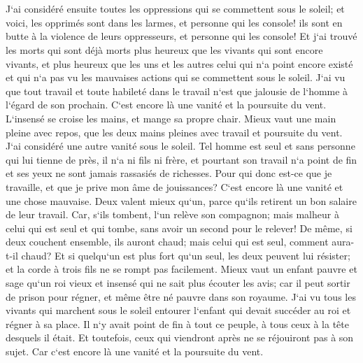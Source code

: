 \chapter{}

\verse J`ai considéré ensuite toutes les oppressions qui se commettent sous le soleil; et voici, les opprimés sont dans les larmes, et personne qui les console! ils sont en butte à la violence de leurs oppresseurs, et personne qui les console! 
\verse Et j`ai trouvé les morts qui sont déjà morts plus heureux que les vivants qui sont encore vivants, 
\verse et plus heureux que les uns et les autres celui qui n`a point encore existé et qui n`a pas vu les mauvaises actions qui se commettent sous le soleil. 
\verse J`ai vu que tout travail et toute habileté dans le travail n`est que jalousie de l`homme à l`égard de son prochain. C`est encore là une vanité et la poursuite du vent. 
\verse L`insensé se croise les mains, et mange sa propre chair. 
\verse Mieux vaut une main pleine avec repos, que les deux mains pleines avec travail et poursuite du vent. 
\verse J`ai considéré une autre vanité sous le soleil. 
\verse Tel homme est seul et sans personne qui lui tienne de près, il n`a ni fils ni frère, et pourtant son travail n`a point de fin et ses yeux ne sont jamais rassasiés de richesses. Pour qui donc est-ce que je travaille, et que je prive mon âme de jouissances? C`est encore là une vanité et une chose mauvaise. 
\verse Deux valent mieux qu`un, parce qu`ils retirent un bon salaire de leur travail. 
\verse Car, s`ils tombent, l`un relève son compagnon; mais malheur à celui qui est seul et qui tombe, sans avoir un second pour le relever! 
\verse De même, si deux couchent ensemble, ils auront chaud; mais celui qui est seul, comment aura-t-il chaud? 
\verse Et si quelqu`un est plus fort qu`un seul, les deux peuvent lui résister; et la corde à trois fils ne se rompt pas facilement. 
\verse Mieux vaut un enfant pauvre et sage qu`un roi vieux et insensé qui ne sait plus écouter les avis; 
\verse car il peut sortir de prison pour régner, et même être né pauvre dans son royaume. 
\verse J`ai vu tous les vivants qui marchent sous le soleil entourer l`enfant qui devait succéder au roi et régner à sa place. 
\verse Il n`y avait point de fin à tout ce peuple, à tous ceux à la tête desquels il était. Et toutefois, ceux qui viendront après ne se réjouiront pas à son sujet. Car c`est encore là une vanité et la poursuite du vent. 

\chapter{}

